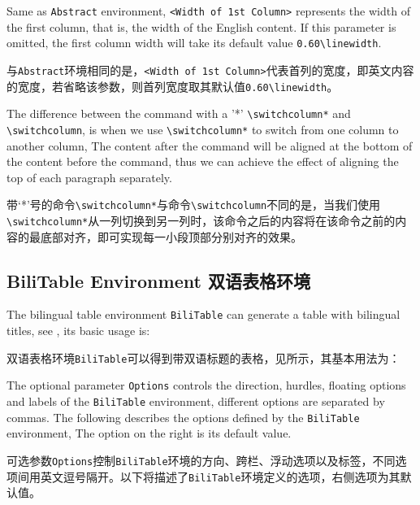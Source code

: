 

\begin{ParaColumn}
    
    Same as \verb"Abstract" environment, \verb"<Width of 1st Column>" represents the width of the first column, that is, the width of the English content. If this parameter is omitted, the first column width will take its default value \verb"0.60\linewidth".

    \switchcolumn

    与\verb"Abstract"环境相同的是，\verb"<Width of 1st Column>"代表首列的宽度，即英文内容的宽度，若省略该参数，则首列宽度取其默认值\verb"0.60\linewidth"。

    \switchcolumn*

    The difference between the command with a '*' \verb"\switchcolumn*" and \verb"\switchcolumn", is when we use \verb"\switchcolumn*" to switch from one column to another column, The content after the command will be aligned at the bottom of the content before the command, thus we can achieve the effect of aligning the top of each paragraph separately.

    \switchcolumn

    带‘*’号的命令\verb"\switchcolumn*"与命令\verb"\switchcolumn"不同的是，当我们使用\verb"\switchcolumn*"从一列切换到另一列时，该命令之后的内容将在该命令之前的内容的最底部对齐，即可实现每一小段顶部分别对齐的效果。

\end{ParaColumn}

\subsection{BiliTable Environment 双语表格环境}

\begin{ParaColumn}

    The bilingual table environment \verb"BiliTable" can generate a table with bilingual titles, see , its basic usage is:
    
    \switchcolumn

    双语表格环境\verb"BiliTable"可以得到带双语标题的表格，见所示，其基本用法为：

\end{ParaColumn}



\begin{ParaColumn}

    The optional parameter \verb"Options" controls the direction, hurdles, floating options and labels of the \verb"BiliTable" environment, different options are separated by commas. The following describes the options defined by the \verb"BiliTable" environment, The option on the right is its default value.

    \switchcolumn

    可选参数\verb"Options"控制\verb"BiliTable"环境的方向、跨栏、浮动选项以及标签，不同选项间用英文逗号隔开。以下将描述了\verb"BiliTable"环境定义的选项，右侧选项为其默认值。

\end{ParaColumn}

